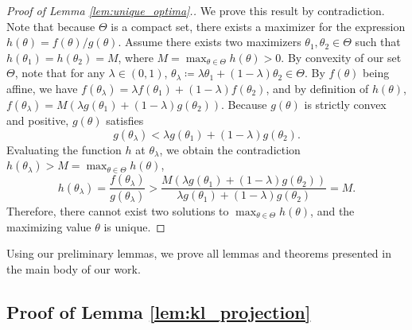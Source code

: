 \documentclass{article}
\begin{document}
\begin{appendices}
\begin{proof}[Proof of Lemma \ref{lem:unique_optima}.]
   We prove this result by contradiction. Note that because $\Theta$ is a compact set, there exists a maximizer for the expression $h(\theta) = f(\theta)/g(\theta)$. Assume there exists two maximizers $\theta_1 , \theta_2 \in \Theta$ such that $h(\theta_1) = h(\theta_2) = M$, where $M=\max_{\theta \in \Theta}h(\theta) > 0$. By convexity of our set $\Theta$, note that for any $\lambda \in (0,1)$, $\theta_{\lambda} \coloneqq \lambda\theta_1 + (1-\lambda)\theta_2 \in \Theta$. By $f(\theta)$ being affine, we have $f(\theta_\lambda) = \lambda f(\theta_1) + (1-\lambda)f(\theta_2)$, and by definition of $h(\theta)$, $f(\theta_{\lambda}) = M(\lambda g(\theta_1) + (1-\lambda)g(\theta_2))$. Because $g(\theta)$ is strictly convex and positive, $g(\theta)$ satisfies
   \begin{equation}
       g(\theta_{\lambda}) < \lambda g(\theta_1) + (1-\lambda)g(\theta_2).
   \end{equation}
   Evaluating the function $h$ at $\theta_\lambda$, we obtain the contradiction $h(\theta_\lambda) > M = \max_{\theta \in \Theta}h(\theta)$,
   $$ h(\theta_{\lambda}) = \frac{f(\theta_\lambda)}{g(\theta_\lambda)} > \frac{M(\lambda g(\theta_1) + (1-\lambda)g(\theta_2))}{\lambda g(\theta_1) + (1-\lambda)g(\theta_2)} = M.$$
   Therefore, there cannot exist two solutions to $\max_{\theta \in \Theta} h(\theta)$, and the maximizing value $\theta$ is unique. 
\end{proof}

Using our preliminary lemmas, we prove all lemmas and theorems presented in the main body of our work. 

\subsection{Proof of Lemma \ref{lem:kl_projection}}



\end{appendices}
\end{document}
